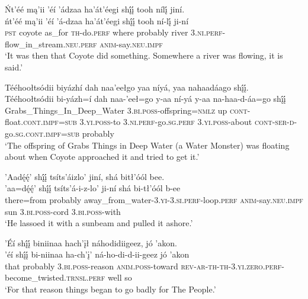 \ea\label{ex:text4-2-4}
Ńt’éé mą’ii ’éí ’ádzaa ha’át’éegi shį́į́ tooh nílį́ jiní.\\
\gll ńt’éé	mą’ii	’éí	’á-dzaa	ha’át’éegi	shį́į́	tooh	ní-lį́	ji-ní\\
     \textsc{pst}	coyote	as\_for	\textsc{th}-do.\textsc{perf}	where	probably	river	3.\textsc{ni}.\textsc{perf}-flow\_in\_stream.\textsc{neu}.\textsc{perf}	\textsc{anim}-say.\textsc{neu}.\textsc{impf}\\
\glt `It was then that Coyote did something. Somewhere a river was flowing, it is said.'
\z

\ea\label{ex:text4-2-5}
Tééhoołtsódii biyázhí dah naa’eełgo yaa níyá, yaa nahaadáago shį́į́.\\
\gll Tééhoołtsódii	bi-yázh=í	dah	naa-’eeł=go	y-aa	ní-yá	y-aa	na-haa-d-áa=go	shį́į́\\
     Grabs\_Things\_In\_Deep\_Water	3.\textsc{bi}.\textsc{poss}-offspring=\textsc{nmlz}	up	\textsc{cont}-float.\textsc{cont}.\textsc{impf}=\textsc{sub}	3.\textsc{yi}.\textsc{poss}-to	3.\textsc{ni}.\textsc{perf}-go.\textsc{sg}.\textsc{perf}	3.\textsc{yi}.\textsc{poss}-about	\textsc{cont}-\textsc{ser}-\textsc{d}-go.\textsc{sg}.\textsc{cont}.\textsc{impf}=\textsc{sub}	probably\\
\glt `The offspring of Grabs Things in Deep Water (a Water Monster) was floating about when Coyote approached it and tried to get it.'
\z

\ea\label{ex:text4-2-6}
’Aadę́ę́’ shį́į́ tsíts’áizlo’ jiní, shá bitł’óól bee.\\
\gll ’aa=dę́ę́’	shį́į́	tsíts’á-i-z-lo’	ji-ní	shá	bi-tł’óól	b-ee\\
     there=from	probably	away\_from\_water-3.\textsc{yi}-3.\textsc{si}.\textsc{perf}-loop.\textsc{perf}	\textsc{anim}-say.\textsc{neu}.\textsc{impf}	sun	3.\textsc{bi}.\textsc{poss}-cord	3.\textsc{bi}.\textsc{poss}-with\\
\glt `He lassoed it with a sunbeam and pulled it ashore.'
\z

\ea\label{ex:text4-2-7}
’Éí shį́į́ biniinaa hach’įł náhodidiigeez, jó ’akon.\\
\gll ’éí	shį́į́	bi-niinaa	ha-ch’į’	ná-ho-di-d-ii-geez	jó	’akon\\
     that	probably	3.\textsc{bi}.\textsc{poss}-reason	\textsc{anim}.\textsc{poss}-toward	\textsc{rev}-\textsc{ar}-\textsc{th}-\textsc{th}-3.\textsc{yi}.\textsc{zero}.\textsc{perf}-become\_twisted.\textsc{trnsl}.\textsc{perf}	well	so\\
\glt `For that reason things began to go badly for The People.'
\z

